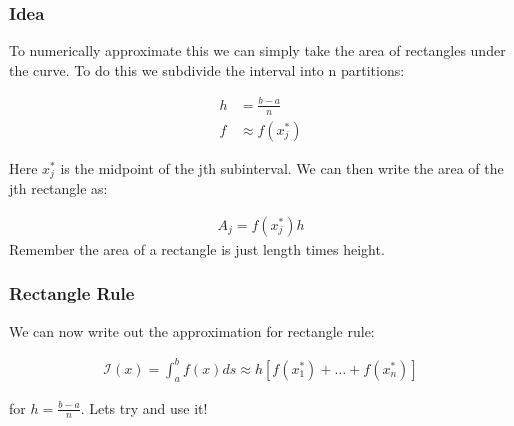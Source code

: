 \documentclass{beamer}
\begin{document}
\begin{frame}
\frametitle{Idea}

To numerically approximate this we can simply take the area of rectangles under the curve. To do this we subdivide the interval into n partitions: 

\begin{align*}
h&=\frac{b-a}{n}\\
f&\approx f(x_j^{\ast})
\end{align*}

Here $x_j^\ast $ is the midpoint of the jth subinterval. We can then write the area of the jth rectangle as: 

\begin{align*}
A_j = f(x_j^\ast) h 
\end{align*}
Remember the area of a rectangle is just length times height. 
\end{frame}


\begin{frame}
\frametitle{Rectangle Rule}

We can now write out the approximation for rectangle rule: 

\begin{align*}
\mathcal{I}(x)= \int^{b}_{a}f(x)ds\approx h[f(x_1^{\ast}) + \hdots + f(x_n^{\ast})]
\end{align*}

for $h=\frac{b-a}{n}$. Lets try and use it! 

\end{frame}
\end{document}
